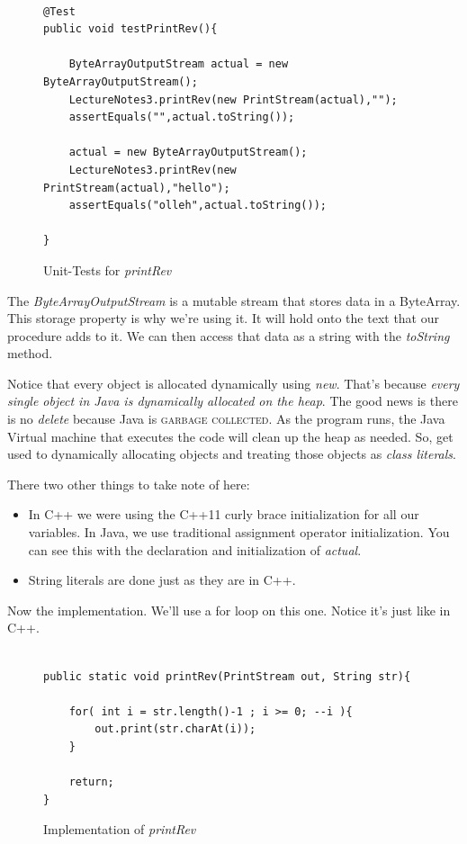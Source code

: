 \documentclass[]{tufte-handout}
\begin{document}
\begin{figure}
\begin{lstlisting}

@Test
public void testPrintRev(){
		
	ByteArrayOutputStream actual = new ByteArrayOutputStream();
	LectureNotes3.printRev(new PrintStream(actual),"");
	assertEquals("",actual.toString());

	actual = new ByteArrayOutputStream();
	LectureNotes3.printRev(new PrintStream(actual),"hello");
	assertEquals("olleh",actual.toString());	
	
}

\end{lstlisting} 
\label{fig:printrevtests}
\caption{Unit-Tests for \textit{printRev}}
\end{figure}

The \textit{ByteArrayOutputStream} is a mutable stream that stores data in a ByteArray. This storage property is why we're using it. It will hold onto the text that our procedure adds to it. We can then access that data as a string with the \textit{toString} method. 

Notice that every object is allocated dynamically using \textit{new}. That's because \textit{every single object in Java is dynamically allocated on the heap}. The good news is there is no \textit{delete} because Java is \textsc{garbage collected}. As the program runs, the Java Virtual machine that executes the code will clean up the heap as needed. So, get used to dynamically allocating objects and treating those objects as \textit{class literals}. 

There two other things to take note of here:
\begin{itemize}
\item In C++ we were using the C++11 curly brace initialization for all our variables. In Java, we use traditional assignment operator initialization. You can see this with the declaration and initialization of \textit{actual}. 
\item String literals are done just as they are in C++. 
\end{itemize}

Now the implementation. We'll use a for loop on this one. Notice it's just like in C++.

\begin{figure}
\begin{lstlisting}

public static void printRev(PrintStream out, String str){
		
	for( int i = str.length()-1 ; i >= 0; --i ){
		out.print(str.charAt(i));
	}
	
	return;
}

\end{lstlisting}
\label{fig:printrevimpl}
\caption{Implementation of \textit{printRev}}
\end{figure}
\end{document}
